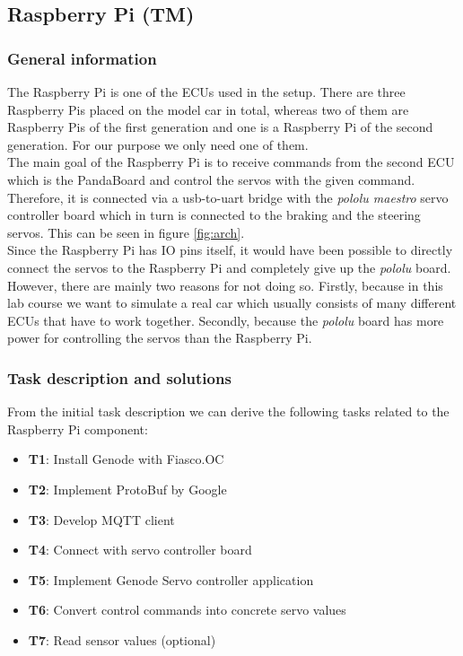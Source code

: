 \subsection{Raspberry Pi (TM)}
\label{sec:rpi}


\subsubsection{General information}
The Raspberry Pi is one of the ECUs used in the setup. There are three Raspberry Pis placed on the model car in total, whereas two of them are Raspberry Pis of the first generation and one is a Raspberry Pi of the second generation. For our purpose we only need one of them. \\

The main goal of the Raspberry Pi is to receive commands from the second ECU which is the PandaBoard and control the servos with the given command. Therefore, it is connected via a usb-to-uart bridge with the \textit{pololu maestro} servo controller board which in turn is connected to the braking and the steering servos. This can be seen in figure \ref{fig:arch}. \\

Since the Raspberry Pi has IO pins itself, it would have been possible to directly connect the servos to the Raspberry Pi and completely give up the \textit{pololu} board. However, there are mainly two reasons for not doing so. Firstly, because in this lab course we want to simulate a real car which usually consists of many different ECUs that have to work together. Secondly, because the \textit{pololu} board has more power for controlling the servos than the Raspberry Pi. 


\subsubsection{Task description and solutions}
From the initial task description we can derive the following tasks related to the Raspberry Pi component:

\begin{itemize}
    \item \textbf{T1}: Install Genode with Fiasco.OC
    \item \textbf{T2}: Implement ProtoBuf by Google
    \item \textbf{T3}: Develop MQTT client
    \item \textbf{T4}: Connect with servo controller board
    \item \textbf{T5}: Implement Genode Servo controller application
    \item \textbf{T6}: Convert control commands into concrete servo values
    \item \textbf{T7}: Read sensor values (optional)
\end{itemize}

